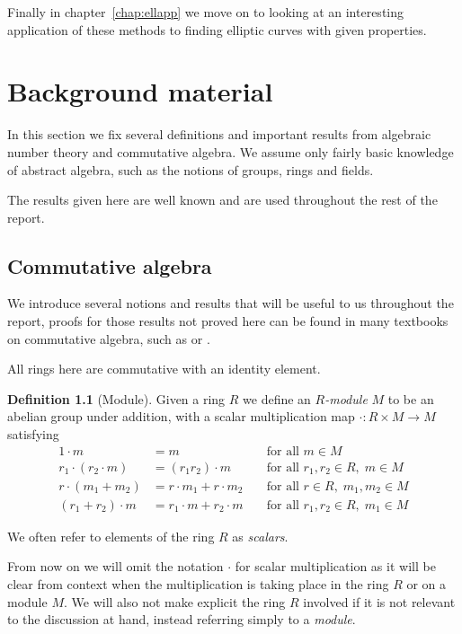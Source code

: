 \documentclass[12pt,a4paper,abstracton,bibtotoc]{scrreprt}
\theoremstyle{definition}
\newtheorem{defn}{Definition}
\begin{document}
Finally in chapter~\ref{chap:ellapp} we move on to looking at an interesting application of these methods to finding elliptic curves with given properties.


\chapter{Background material}
\label{chap:background}

In this section we fix several definitions and important results from algebraic number theory and commutative algebra.
We assume only fairly basic knowledge of abstract algebra, such as the notions of groups, rings and fields.

The results given here are well known and are used throughout the rest of the report.

\section{Commutative algebra}
\label{sec:ca}
We introduce several notions and results that will be useful to us throughout the report, proofs for those results not proved here can be found in many textbooks on commutative algebra, such as \cite{am} or \cite{matsumura}.

All rings here are commutative with an identity element.
\begin{defn}[Module]
Given a ring $R$ we define an \emph{$R$-module} $M$ to be an abelian group under addition, with a scalar multiplication map $\cdot \colon R\times M \to M$ satisfying
\begin{align*}
1\cdot m &= m \; &&\text{for all } m\in M \\
r_1\cdot(r_2 \cdot m) &= (r_1r_2)\cdot m \; &&\text{for all } r_1,r_2\in R,\; m\in M \\
r\cdot(m_1 + m_2) &= r\cdot m_1 + r\cdot m_2 \; &&\text{for all } r\in R, \; m_1,m_2\in M \\
(r_1 + r_2)\cdot m &= r_1\cdot m + r_2\cdot m \; &&\text{for all } r_1,r_2\in R, \; m_1\in M
\end{align*}
\end{defn}

We often refer to elements of the ring $R$ as \emph{scalars}.

From now on we will omit the notation $\cdot$ for scalar multiplication as it will be clear from context when the multiplication is taking place in the ring $R$ or on a module $M$.
We will also not make explicit the ring $R$ involved if it is not relevant to the discussion at hand, instead referring simply to a \emph{module}.
\end{document}
